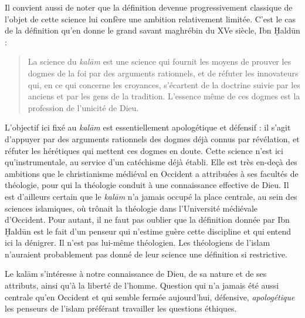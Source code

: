 Il convient aussi de noter que la définition devenue progressivement
classique de l'objet de cette science lui confère une ambition
relativement limitée. C'est le cas de la définition qu'en donne le grand
savant maghrébin du XVe siècle, Ibn Ḫaldūn \label{Theol:IbnKhaldun2}:

\begin{quote}
La science du \emph{kalām} est une science qui fournit les moyens de
prouver les dogmes de la foi par des arguments rationnels, et de réfuter
les innovateurs qui, en ce qui concerne les croyances, s'écartent de la
doctrine suivie par les anciens et par les gens de la tradition.
L'essence même de ces dogmes est la profession de l'unicité de
Dieu.
\end{quote}

L'objectif ici fixé au \emph{kalām} est essentiellement apologétique et
défensif : il s'agit d'appuyer par des arguments rationnels des dogmes
déjà connus par révélation, et réfuter les hérétiques qui mettent ces
dogmes en doute. Cette science n'est ici qu'instrumentale, au service
d'un catéchisme déjà établi. Elle est très en-deçà des ambitions que le
christianisme médiéval en Occident a attribuées à ses facultés de
théologie, pour qui la théologie conduit à une connaissance effective de
Dieu. Il est d'ailleurs certain que le \emph{kalām} n'a jamais occupé la
place centrale, au sein des sciences islamiques, où trônait la théologie
dans l'Université médiévale d'Occident. Pour autant, il ne faut pas
oublier que la définition donnée par Ibn Ḫaldūn est le fait d'un penseur
qui n'estime guère cette discipline et qui entend ici la dénigrer. Il
n'est pas
lui-même théologien. Les théologiens de l'islam n'auraient probablement
pas donné de leur
science une définition si restrictive.

\begin{Synthesis}
Le kalām s'intéresse à notre connaissance de Dieu, de sa nature et de ses attributs, ainsi qu'à la liberté de l'homme. Question qui n'a jamais été aussi centrale qu'en Occident et qui semble fermée aujourd'hui, défensive, \textit{apologétique} les penseurs de l'islam préférant travailler les questions éthiques.
\end{Synthesis}

